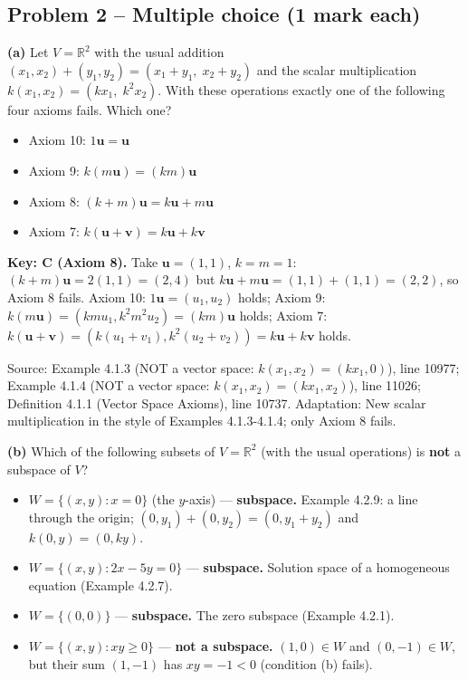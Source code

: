 \documentclass[11pt,a4paper]{article}
\newcommand{\Src}[1]{{\footnotesize\color{black!65}Source: #1}}
\begin{document}
\subsection*{Problem 2 -- Multiple choice (1 mark each)}
\textbf{(a)} Let $V=\mathbb{R}^2$ with the usual addition $(x_1,x_2)+(y_1,y_2)=(x_1+y_1,\;x_2+y_2)$ and the scalar multiplication $k(x_1,x_2)=(kx_1,\;k^2x_2)$. With these operations exactly one of the following four axioms fails. Which one?\par
\begin{itemize}[leftmargin=8mm,itemsep=0pt]\item[A] Axiom 10: $1\mathbf{u}=\mathbf{u}$\item[B] Axiom 9: $k(m\mathbf{u})=(km)\mathbf{u}$\item[C$^{\ast}$] Axiom 8: $(k+m)\mathbf{u}=k\mathbf{u}+m\mathbf{u}$\item[D] Axiom 7: $k(\mathbf{u}+\mathbf{v})=k\mathbf{u}+k\mathbf{v}$\end{itemize}
\textbf{Key: C (Axiom 8).} Take $\mathbf{u}=(1,1)$, $k=m=1$: $(k+m)\mathbf{u}=2(1,1)=(2,4)$ but $k\mathbf{u}+m\mathbf{u}=(1,1)+(1,1)=(2,2)$, so Axiom 8 fails. Axiom 10: $1\mathbf{u}=(u_1,u_2)$ holds; Axiom 9: $k(m\mathbf{u})=(kmu_1,k^2m^2u_2)=(km)\mathbf{u}$ holds; Axiom 7: $k(\mathbf{u}+\mathbf{v})=(k(u_1+v_1),k^2(u_2+v_2))=k\mathbf{u}+k\mathbf{v}$ holds.\par
\Src{Example 4.1.3 (NOT a vector space: $k(x_1,x_2)=(kx_1,0)$), line 10977; Example 4.1.4 (NOT a vector space: $k(x_1,x_2)=(kx_1,x_2)$), line 11026; Definition 4.1.1 (Vector Space Axioms), line 10737. Adaptation: New scalar multiplication in the style of Examples 4.1.3-4.1.4; only Axiom 8 fails.}\par
{}\textbf{(b)} Which of the following subsets of $V=\mathbb{R}^2$ (with the usual operations) is \textbf{not} a subspace of $V$?\par
\begin{itemize}[leftmargin=8mm,itemsep=0pt]\item[A] $W=\{(x,y) : x=0\}$ (the $y$-axis) --- \textbf{subspace.} Example 4.2.9: a line through the origin; $(0,y_1)+(0,y_2)=(0,y_1+y_2)$ and $k(0,y)=(0,ky)$.\item[B] $W=\{(x,y) : 2x-5y=0\}$ --- \textbf{subspace.} Solution space of a homogeneous equation (Example 4.2.7).\item[C] $W=\{(0,0)\}$ --- \textbf{subspace.} The zero subspace (Example 4.2.1).\item[D$^{\ast}$] $W=\{(x,y) : xy\ge0\}$ --- \textbf{not a subspace.} $(1,0)\in W$ and $(0,-1)\in W$, but their sum $(1,-1)$ has $xy=-1<0$ (condition (b) fails).\end{itemize}
\end{document}
